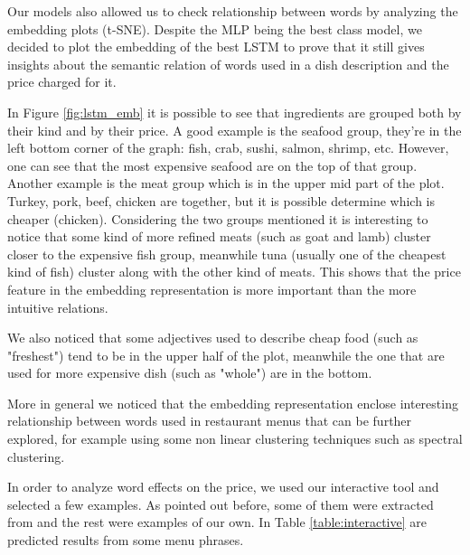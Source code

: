 \documentclass[11pt,letterpaper]{article}
\begin{document}
Our models also allowed us to check relationship between words by analyzing the embedding plots (t-SNE). Despite the MLP being the best class model, we decided to plot the embedding of the best LSTM to prove that it still gives insights about the semantic relation of words used in a dish description and the price charged for it.

In Figure \ref{fig:lstm_emb} it is possible to see that ingredients are grouped both by their kind and by their price. A good example is the seafood group, they're in the left bottom corner of the graph: fish, crab, sushi, salmon, shrimp, etc. However, one can see that the most expensive seafood are on the top of that group. Another example is the meat group which is in the upper mid part of the plot. Turkey, pork, beef, chicken  are together, but it is possible determine which is cheaper (chicken). Considering the two groups mentioned it is interesting to notice that some kind of more refined  meats (such as goat and lamb) cluster closer to the expensive fish group, meanwhile tuna (usually one of the cheapest kind of fish) cluster along with the other kind of meats. This shows that the price feature in the embedding representation is more important than the more intuitive relations.

We also noticed that some adjectives used to describe cheap food (such as "freshest") tend to be in the upper half of the plot, meanwhile the one that are used for more expensive dish (such as "whole") are in the bottom.

More in general we noticed that the embedding representation enclose interesting relationship between words used in restaurant menus that can be further explored, for example using some non linear clustering techniques such as spectral clustering.

In order to analyze word effects on the price, we used our interactive tool and selected a few examples. As pointed out before, some of them were extracted from \cite{jurafsky2014language} and the rest were examples of our own.  In Table \ref{table:interactive} are predicted results from some menu phrases. 
\end{document}
